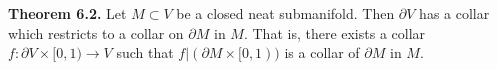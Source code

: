 \textbf{Theorem 6.2.} Let $M \subset V$ be a closed neat submanifold. Then $\partial V$ has a collar which restricts to a collar on $\partial M$ in $M$. That is, there exists a collar $f: \partial V \times [0, 1) \rightarrow V$ such that $f|(\partial M \times [0, 1))$ is a collar of $\partial M$ in $M$.
